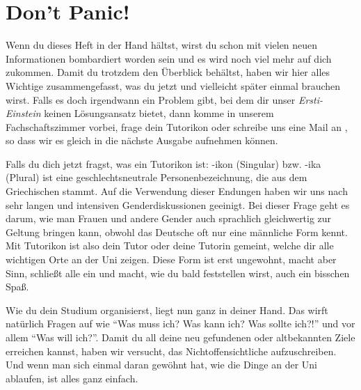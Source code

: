 %
%

\chapter{Don't Panic!}

Wenn du dieses Heft in der Hand hältst, wirst du schon mit vielen neuen Informationen bombardiert worden sein und es wird noch viel mehr auf dich zukommen. Damit du trotzdem den Überblick behältst, haben wir hier alles Wichtige zusammengefasst, was du jetzt und vielleicht später einmal brauchen wirst. Falls es doch irgendwann ein Problem gibt, bei dem dir unser \emph{Ersti-Einstein} keinen Lösungsansatz bietet, dann komme in unserem Fachschaftszimmer vorbei, frage dein Tutorikon oder schreibe uns eine Mail an , so dass wir es gleich in die nächste Ausgabe aufnehmen können. 

Falls du dich jetzt fragst, was ein Tutorikon ist: -ikon (Singular) bzw. -ika (Plural) ist eine geschlechtsneutrale Personenbezeichnung, die aus dem Griechischen stammt. Auf die Verwendung dieser Endungen haben wir uns nach sehr langen und intensiven Genderdiskussionen geeinigt. Bei dieser Frage geht es darum, wie man Frauen und andere Gender auch sprachlich gleichwertig zur Geltung bringen kann, obwohl das Deutsche oft nur eine männliche Form kennt. Mit Tutorikon ist also dein Tutor oder deine Tutorin gemeint, welche dir alle wichtigen Orte an der Uni zeigen. Diese Form ist erst ungewohnt, macht aber Sinn, schließt alle ein und macht, wie du bald feststellen wirst, auch ein bisschen Spaß.

Wie du dein Studium organisierst, liegt nun ganz in deiner Hand. Das wirft natürlich Fragen auf wie ``Was muss ich? Was kann ich? Was sollte ich?!'' und vor allem ``Was will ich?''. Damit du all deine neu gefundenen oder altbekannten Ziele erreichen kannst, haben wir versucht, das Nichtoffensichtliche aufzuschreiben. Und wenn man sich einmal daran gewöhnt hat, wie die Dinge an der Uni ablaufen, ist alles ganz einfach.

